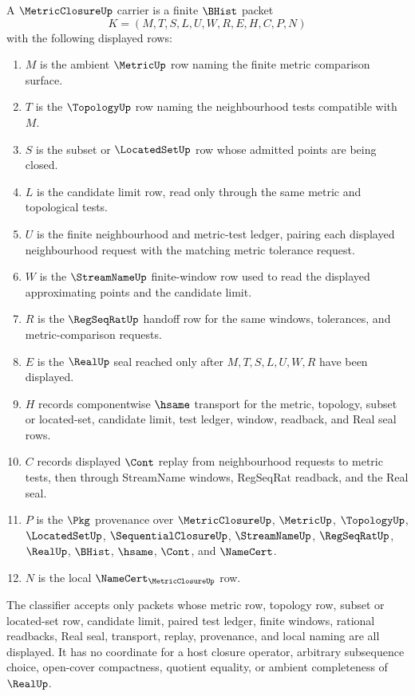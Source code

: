 \begin{definition}
\label{def:metric-closure-carrier}
A $\MetricClosureUp$ carrier is a finite $\BHist$ packet
$$
K=(M,T,S,L,U,W,R,E,H,C,P,N)
$$
with the following displayed rows:
\begin{enumerate}
\item $M$ is the ambient $\MetricUp$ row naming the finite metric comparison surface.
\item $T$ is the $\TopologyUp$ row naming the neighbourhood tests compatible with $M$.
\item $S$ is the subset or $\LocatedSetUp$ row whose admitted points are being closed.
\item $L$ is the candidate limit row, read only through the same metric and topological tests.
\item $U$ is the finite neighbourhood and metric-test ledger, pairing each displayed neighbourhood request with the matching metric tolerance request.
\item $W$ is the $\StreamNameUp$ finite-window row used to read the displayed approximating points and the candidate limit.
\item $R$ is the $\RegSeqRatUp$ handoff row for the same windows, tolerances, and metric-comparison requests.
\item $E$ is the $\RealUp$ seal reached only after $M,T,S,L,U,W,R$ have been displayed.
\item $H$ records componentwise $\hsame$ transport for the metric, topology, subset or located-set, candidate limit, test ledger, window, readback, and Real seal rows.
\item $C$ records displayed $\Cont$ replay from neighbourhood requests to metric tests, then through StreamName windows, RegSeqRat readback, and the Real seal.
\item $P$ is the $\Pkg$ provenance over $\MetricClosureUp$, $\MetricUp$, $\TopologyUp$, $\LocatedSetUp$, $\SequentialClosureUp$, $\StreamNameUp$, $\RegSeqRatUp$, $\RealUp$, $\BHist$, $\hsame$, $\Cont$, and $\NameCert$.
\item $N$ is the local $\NameCert_{\MetricClosureUp}$ row.
\end{enumerate}
The classifier accepts only packets whose metric row, topology row, subset or located-set row, candidate limit, paired test ledger, finite windows, rational readbacks, Real seal, transport, replay, provenance, and local naming are all displayed. It has no coordinate for a host closure operator, arbitrary subsequence choice, open-cover compactness, quotient equality, or ambient completeness of $\RealUp$.
\end{definition}


